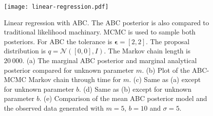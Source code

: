 \begin{figure}[H]
	\centering
	\texttt{[image: linear-regression.pdf]}
	\caption{Linear regression with ABC. The ABC posterior is also compared to traditional likelihood machinary. MCMC is used to sample both posteriors. For ABC the tolerance is $\bm{\epsilon} = [2,2]$. The proposal distribution is $q = \mathcal{N}([0,0],I)$. The Markov chain length is $20\ 000$. (a) The marginal ABC posterior and marginal analytical posterior compared for unknown parameter $m$. (b) Plot of the ABC-MCMC Markov chain through time for $m$. (c) Same as (a) except for unknown parameter $b$. (d) Same as (b) except for unknown parameter $b$. (e) Comparison of the mean ABC posterior model and the observed data generated with $m = 5$, $b = 10$ and $\sigma = 5$.}
	\label{linear-regression}
\end{figure}


